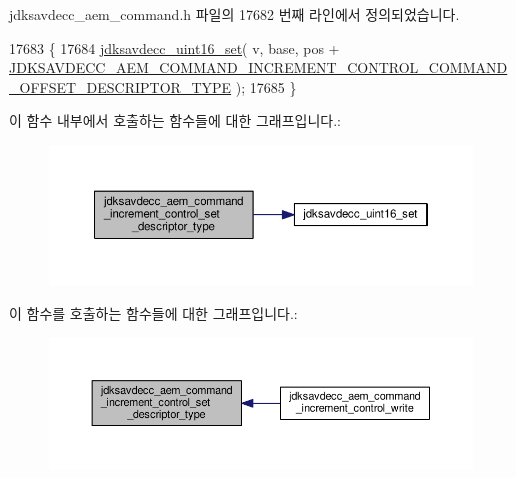 jdksavdecc\+\_\+aem\+\_\+command.\+h 파일의 17682 번째 라인에서 정의되었습니다.


\begin{DoxyCode}
17683 \{
17684     \hyperlink{group__endian_ga14b9eeadc05f94334096c127c955a60b}{jdksavdecc\_uint16\_set}( v, base, pos + 
      \hyperlink{group__command__increment__control_gab6f92328d54d984c88303e83f8ccf72b}{JDKSAVDECC\_AEM\_COMMAND\_INCREMENT\_CONTROL\_COMMAND\_OFFSET\_DESCRIPTOR\_TYPE}
       );
17685 \}
\end{DoxyCode}


이 함수 내부에서 호출하는 함수들에 대한 그래프입니다.\+:
\nopagebreak
\begin{figure}[H]
\begin{center}
\leavevmode
\includegraphics[width=350pt]{group__command__increment__control_gac3b9d3634e23837b45df8274444e8948_cgraph}
\end{center}
\end{figure}




이 함수를 호출하는 함수들에 대한 그래프입니다.\+:
\nopagebreak
\begin{figure}[H]
\begin{center}
\leavevmode
\includegraphics[width=350pt]{group__command__increment__control_gac3b9d3634e23837b45df8274444e8948_icgraph}
\end{center}
\end{figure}


